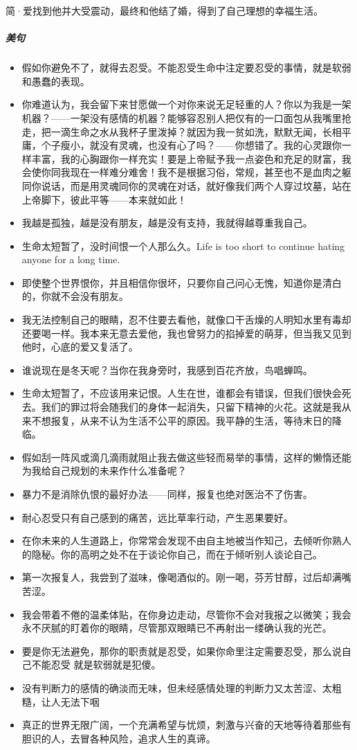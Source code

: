 \documentclass[UTF8,a4paper,8pt]{ctexart}
\begin{document}
 简·爱找到他并大受震动，最终和他结了婚，得到了自己理想的幸福生活。
 
 \subparagraph{美句}
 \begin{itemize}
 	\item  假如你避免不了，就得去忍受。不能忍受生命中注定要忍受的事情，就是软弱和愚蠢的表现。
 	\item  你难道认为，我会留下来甘愿做一个对你来说无足轻重的人？你以为我是一架机器？——一架没有感情的机器？能够容忍别人把仅有的一口面包从我嘴里抢走，把一滴生命之水从我杯子里泼掉？就因为我一贫如洗，默默无闻，长相平庸，个子瘦小，就没有灵魂，也没有心了吗？——你想错了。我的心灵跟你一样丰富，我的心胸跟你一样充实！要是上帝赋予我一点姿色和充足的财富，我会使你同我现在一样难分难舍！我不是根据习俗，常规，甚至也不是血肉之躯同你说话，而是用灵魂同你的灵魂在对话，就好像我们两个人穿过坟墓，站在上帝脚下，彼此平等——本来就如此！
 	\item  我越是孤独，越是没有朋友，越是没有支持，我就得越尊重我自己。
 	\item  生命太短暂了，没时间恨一个人那么久。Life is too short to continue hating anyone for a long time.
 	\item  即使整个世界恨你，并且相信你很坏，只要你自己问心无愧，知道你是清白的，你就不会没有朋友。
 	\item  我无法控制自己的眼睛，忍不住要去看他，就像口干舌燥的人明知水里有毒却还要喝一样。我本来无意去爱他，我也曾努力的掐掉爱的萌芽，但当我又见到他时，心底的爱又复活了。
 	\item  谁说现在是冬天呢？当你在我身旁时，我感到百花齐放，鸟唱蝉鸣。
 	\item  生命太短暂了，不应该用来记恨。人生在世，谁都会有错误，但我们很快会死去。我们的罪过将会随我们的身体一起消失，只留下精神的火花。这就是我从来不想报复，从来不认为生活不公平的原因。我平静的生活，等待末日的降临。
 	\item  假如刮一阵风或滴几滴雨就阻止我去做这些轻而易举的事情，这样的懒惰还能为我给自己规划的未来作什么准备呢？
 	\item  暴力不是消除仇恨的最好办法——同样，报复也绝对医治不了伤害。
 	\item  耐心忍受只有自己感到的痛苦，远比草率行动，产生恶果要好。
 	\item  在你未来的人生道路上，你常常会发现不由自主地被当作知己，去倾听你熟人的隐秘。你的高明之处不在于谈论你自己，而在于倾听别人谈论自己。
 	\item  第一次报复人，我尝到了滋味，像喝酒似的。刚一喝，芬芳甘醇，过后却满嘴苦涩。
 	\item  我会带着不倦的温柔体贴，在你身边走动，尽管你不会对我报之以微笑；我会永不厌腻的盯着你的眼睛，尽管那双眼睛已不再射出一缕确认我的光芒。
 	\item  要是你无法避免，那你的职责就是忍受，如果你命里注定需要忍受，那么说自己不能忍受 就是软弱就是犯傻。
 	\item  没有判断力的感情的确淡而无味，但未经感情处理的判断力又太苦涩、太粗糙，让人无法下咽
 	\item  真正的世界无限广阔，一个充满希望与忧烦，刺激与兴奋的天地等待着那些有胆识的人，去冒各种风险，追求人生的真谛。
 \end{itemize}
 
\end{document}
